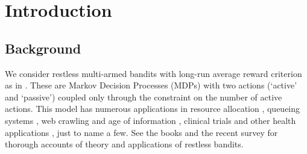 \documentclass[12pt]{article}
\numberwithin{equation}{section}
\newcommand{\1}{\textbf{1}}
\begin{document}
\section{Introduction}
\label{sec:intro}

\subsection{Background}

We consider restless multi-armed bandits with long-run average reward criterion as in \cite{Whittle}. These are 
Markov Decision Processes (MDPs) with two actions (`active' and `passive') coupled only through the constraint 
on the number of active actions. This model has numerous applications in resource allocation \cite{AvrachenkovAyesta,Liu}, 
queueing systems \cite{Aalto,Ansell,Duran}, web crawling and age of information \cite{Avrachenkov,Hsu,Tripathy}, clinical trials 
and other health applications \cite{Biswas,Verma,Vilar}, just to name a few. See the books \cite{GittinsBook,JackoBook,RuizBook} and the recent survey 
\cite{Nino-Mora} for thorough accounts of theory and applications of restless bandits.
\end{document}

